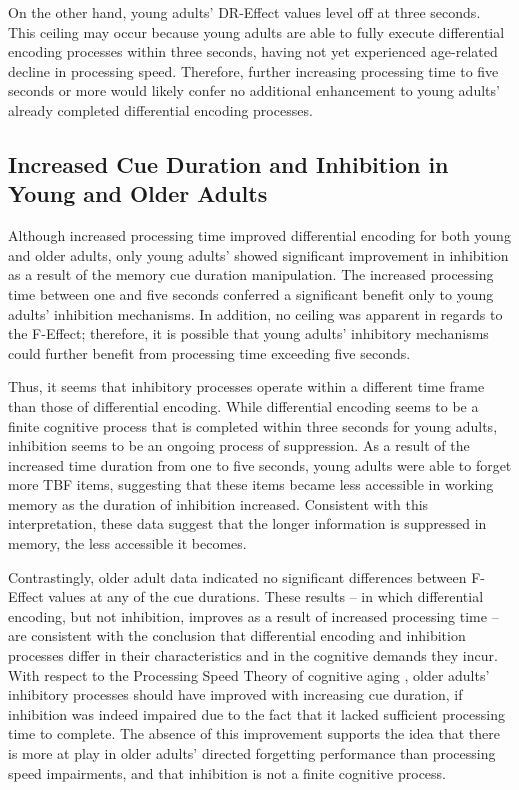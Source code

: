 \documentclass[man]{apa6}\usepackage[]{graphicx}\usepackage[]{color}
\begin{document}
On the other hand, young adults’ DR-Effect values level off at three seconds. This ceiling may occur because young adults are able to fully execute differential encoding processes within three seconds, having not yet experienced age-related decline in processing speed. Therefore, further increasing processing time to five seconds or more would likely confer no additional enhancement to young adults’ already completed differential encoding processes.

\subsection*{Increased Cue Duration and Inhibition in Young and Older Adults}

Although increased processing time improved differential encoding for both young and older adults, only young adults’ showed significant improvement in inhibition as a result of the memory cue duration manipulation. The increased processing time between one and five seconds conferred a significant benefit only to young adults’ inhibition mechanisms. In addition, no ceiling was apparent in regards to the F-Effect; therefore, it is possible that young adults’ inhibitory mechanisms could further benefit from processing time exceeding five seconds.

Thus, it seems that inhibitory processes operate within a different time frame than those of differential encoding. While differential encoding seems to be a finite cognitive process that is completed within three seconds for young adults, inhibition seems to be an ongoing process of suppression. As a result of the increased time duration from one to five seconds, young adults were able to forget more TBF items, suggesting that these items became less accessible in working memory as the duration of inhibition increased. Consistent with this interpretation, these data suggest that the longer information is suppressed in memory, the less accessible it becomes.

Contrastingly, older adult data indicated no significant differences between F-Effect values at any of the cue durations. These results – in which differential encoding, but not inhibition, improves as a result of increased processing time – are consistent with the conclusion that differential encoding and inhibition processes differ in their characteristics and in the cognitive demands they incur. With respect to the Processing Speed Theory of cognitive aging \parencite{salthouse1996}, older adults’ inhibitory processes should have improved with increasing cue duration, if inhibition was indeed impaired due to the fact that it lacked sufficient processing time to complete. The absence of this improvement supports the idea that there is more at play in older adults’ directed forgetting performance than processing speed impairments, and that inhibition is not a finite cognitive process.
\end{document}
